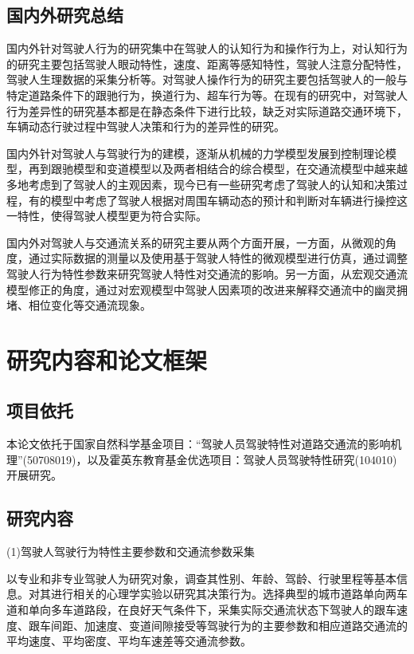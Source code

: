 \subsection{国内外研究总结}

国内外针对驾驶人行为的研究集中在驾驶人的认知行为和操作行为上，对认知行为的研究主要包括驾驶人眼动特性，速度、距离等感知特性，驾驶人注意分配特性，驾驶人生理数据的采集分析等。对驾驶人操作行为的研究主要包括驾驶人的一般与特定道路条件下的跟驰行为，换道行为、超车行为等。在现有的研究中，对驾驶人行为差异性的研究基本都是在静态条件下进行比较，缺乏对实际道路交通环境下，车辆动态行驶过程中驾驶人决策和行为的差异性的研究。

国内外针对驾驶人与驾驶行为的建模，逐渐从机械的力学模型发展到控制理论模型，再到跟驰模型和变道模型以及两者相结合的综合模型，在交通流模型中越来越多地考虑到了驾驶人的主观因素，现今已有一些研究考虑了驾驶人的认知和决策过程，有的模型中考虑了驾驶人根据对周围车辆动态的预计和判断对车辆进行操控这一特性，使得驾驶人模型更为符合实际。

国内外对驾驶人与交通流关系的研究主要从两个方面开展，一方面，从微观的角度，通过实际数据的测量以及使用基于驾驶人特性的微观模型进行仿真，通过调整驾驶人行为特性参数来研究驾驶人特性对交通流的影响。另一方面，从宏观交通流模型修正的角度，通过对宏观模型中驾驶人因素项的改进来解释交通流中的幽灵拥堵、相位变化等交通流现象。%

\section{研究内容和论文框架}

\subsection{项目依托}

本论文依托于国家自然科学基金项目：“驾驶人员驾驶特性对道路交通流的影响机理”(50708019)，以及霍英东教育基金优选项目：驾驶人员驾驶特性研究(104010)开展研究。

\subsection{研究内容}
(1)驾驶人驾驶行为特性主要参数和交通流参数采集

以专业和非专业驾驶人为研究对象，调查其性别、年龄、驾龄、行驶里程等基本信息。对其进行相关的心理学实验以研究其决策行为。选择典型的城市道路单向两车道和单向多车道路段，在良好天气条件下，采集实际交通流状态下驾驶人的跟车速度、跟车间距、加速度、变道间隙接受等驾驶行为的主要参数和相应道路交通流的平均速度、平均密度、平均车速差等交通流参数。

